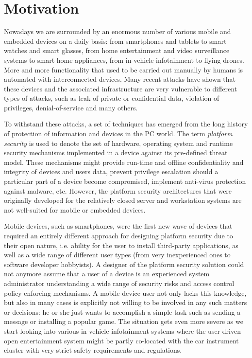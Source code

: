 
\section{Motivation}

Nowadays we are surrounded by an enormous number of various mobile and embedded devices on a daily basis: from smartphones and tablets to smart watches and smart glasses, from home entertainment and video surveillance systems to smart home appliances, from in-vehicle infotainment to flying drones. More and more functionality that used to be carried out manually by humans is automated with interconnected devices. Many recent attacks have shown that these devices and the associated infrastructure are very vulnerable to different types of attacks, such as leak of private or confidential data, violation of privileges, denial-of-service and many others. 

To withstand these attacks, a set of techniques has emerged from the long history of protection of information and devices in the PC world. The term \textit{platform security} is used to denote the set of hardware, operating system and runtime security mechanisms implemented in a device against its pre-defined threat model. These mechanisms might provide run-time and offline confidentiality and integrity of devices and users data, prevent privilege escalation should a particular part of a device become compromised, implement anti-virus protection against malware, etc. However, the platform security architectures that were originally developed for the relatively closed server and workstation systems are not well-suited for mobile or embedded devices. 

Mobile devices, such as smartphones, were the first new wave of devices that required an entirely different approach for designing platform security due to their open nature, i.e. ability for the user to install third-party applications, as well as a wide range of different user types (from very inexperienced ones to software developer hobbyists). A designer of the platform security solution could not anymore assume that a user of a device is an experienced system administrator understanding a wide range of security risks and access control policy enforcing mechanisms. A mobile device user not only lacks this knowledge, but also in many cases is explicitly not willing to be involved in any such matters or decisions: he or she just wants to accomplish a simple task such as sending a message or installing a popular game. The situation gets even more severe as we start looking into various in-vehicle infotainment systems where the user-driven open entertainment system might be partly co-located with the car instrument cluster with very strict safety requirements and regulations. 

